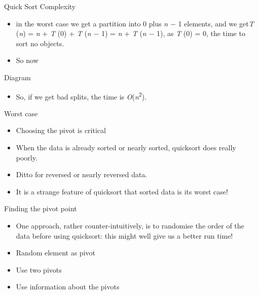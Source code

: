 \documentclass{beamer}
\begin{document}
\begin{frame}
\end{frame} \begin{frame}

Quick Sort Complexity

\begin{itemize}
\item in the worst case we get a partition into 0 plus \textit{n }$-$ 1 elements, and we get\textit{T
}(\textit{n}) = \textit{n }+ \textit{T }(0) + \textit{T }(\textit{n }$-$ 1) = \textit{n }+ \textit{T }(\textit{n }$-$
1), as \textit{T }(0) = 0, the time to sort no objects. 
\item So now
\end{itemize}

Diagram

\begin{itemize}
\item So, if we get bad splits, the time is \textit{O}(\textit{n}\textsuperscript{2}). 
\end{itemize}

\end{frame} \begin{frame}

Worst case

\begin{itemize}
\item Choosing the pivot is critical
\item When the data is already sorted or nearly sorted, quicksort does really poorly.
\item Ditto for reversed or nearly reversed data.
\item It is a strange feature of quicksort that sorted data is its worst case!
\end{itemize}

\end{frame} \begin{frame} 

Finding the pivot point

\begin{itemize}
\item One approach, rather counter-intuitively, is to randomise the order of the data before using quicksort: this might
well give us a better run time!
\item Random element as pivot
\item Use two pivots
\item Use information about the pivots
\end{itemize}

\end{frame} \begin{frame}


\end{frame}
\end{document}
